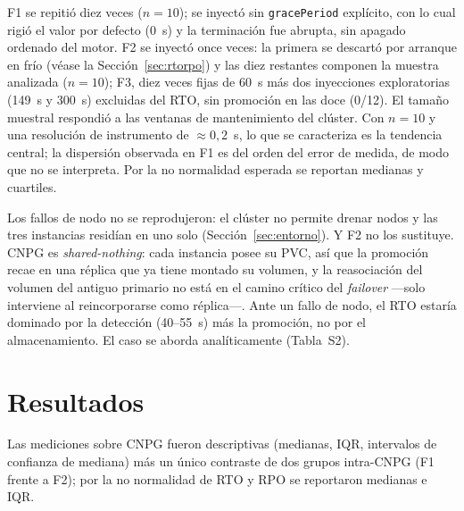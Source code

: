 \documentclass[12pt,twocolumn,letterpaper]{article}
\begin{document}
F1 se repitió diez veces ($n=10$); se inyectó sin \texttt{gracePeriod} explícito, con lo cual rigió el valor por defecto (0~s) y la terminación fue abrupta, sin apagado ordenado del motor. F2 se inyectó once veces: la primera se descartó por arranque en frío (véase la Sección~\ref{sec:rtorpo}) y las diez restantes componen la muestra analizada ($n=10$); F3, diez veces fijas de 60~s más dos inyecciones exploratorias (149~s y 300~s) excluidas del RTO, sin promoción en las doce (0/12). El tamaño muestral respondió a las ventanas de mantenimiento del clúster. Con $n=10$ y una resolución de instrumento de $\approx0{,}2$~s, lo que se caracteriza es la tendencia central; la dispersión observada en F1 es del orden del error de medida, de modo que no se interpreta. Por la no normalidad esperada se reportan medianas y cuartiles.

Los fallos de nodo no se reprodujeron: el clúster no permite drenar nodos y las tres instancias residían en uno solo (Sección~\ref{sec:entorno}). Y F2 no los sustituye. CNPG es \emph{shared-nothing}: cada instancia posee su PVC, así que la promoción recae en una réplica que ya tiene montado su volumen, y la reasociación del volumen del antiguo primario no está en el camino crítico del \textit{failover} —solo interviene al reincorporarse como réplica—. Ante un fallo de nodo, el RTO estaría dominado por la detección (40--55~s) más la promoción, no por el almacenamiento. El caso se aborda analíticamente (Tabla~S2).

\section{Resultados}\label{sec:res}
Las mediciones sobre CNPG fueron descriptivas (medianas, IQR, intervalos de confianza de mediana) más un único contraste de dos grupos intra-CNPG (F1 frente a F2); por la no normalidad de RTO y RPO se reportaron medianas e IQR.
\end{document}
